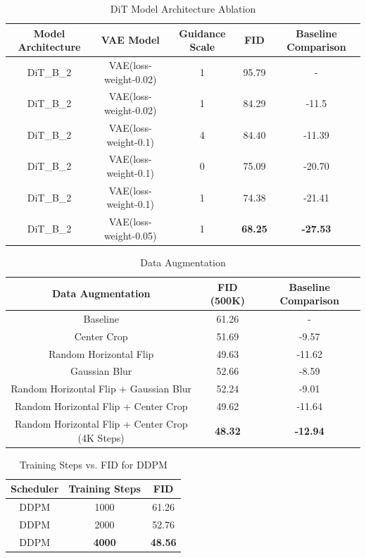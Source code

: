 \documentclass[conference]{IEEEtran}
\begin{document}
\begin{table}[H]
    \centering
    \caption{DiT Model Architecture Ablation}
    \label{tab:dit_table2}
    \begin{tabular}{ccccc}
    \hline
        Model Architecture & VAE Model & Guidance Scale & FID & Baseline Comparison \\ \hline
        \hline
        DiT\_B\_2 & VAE(loss-weight-0.02) & 1 & 95.79 & - \\
        \hline
        DiT\_B\_2 & VAE(loss-weight-0.02) & 1 & 84.29 & -11.5 \\ 
        DiT\_B\_2 & VAE(loss-weight-0.1) & 4 & 84.40 & -11.39 \\ 
        DiT\_B\_2 & VAE(loss-weight-0.1) & 0 & 75.09 & -20.70 \\ 
        DiT\_B\_2 & VAE(loss-weight-0.1) & 1 & 74.38 & -21.41 \\ 
        DiT\_B\_2 & VAE(loss-weight-0.05) & 1 & \textbf{68.25} & \textbf{-27.53} \\ \hline
    \end{tabular}
\end{table}

\begin{table}[H]
    \centering
    \caption{Data Augmentation}
    \label{tab:aug_table}
    \begin{tabular}{ccc}
    \hline
        Data Augmentation & FID (500K) & Baseline Comparison \\ \hline
        \hline
        Baseline & 61.26 & - \\ 
        \hline
        Center Crop & 51.69 & -9.57 \\ 
        Random Horizontal Flip & 49.63 & -11.62 \\ 
        Gaussian Blur & 52.66 & -8.59 \\ 
        Random Horizontal Flip + Gaussian Blur & 52.24 & -9.01 \\ 
        Random Horizontal Flip + Center Crop & 49.62 & -11.64 \\ 
        Random Horizontal Flip + Center Crop (4K Steps) & \textbf{48.32} & \textbf{-12.94} \\ \hline
    \end{tabular}
\end{table}

\begin{table}[H]
    \centering
    \caption{Training Steps vs. FID for DDPM}
    \label{tab:scheduler_table}
    \begin{tabular}{ccc}
    \hline
        Scheduler & Training Steps & FID \\
        \hline
        \hline
        DDPM & 1000 & 61.26 \\
        \hline
        DDPM & 2000 & 52.76 \\ 
        DDPM & \textbf{4000} & \textbf{48.56} \\ \hline
    \end{tabular}
\end{table}
\end{document}
